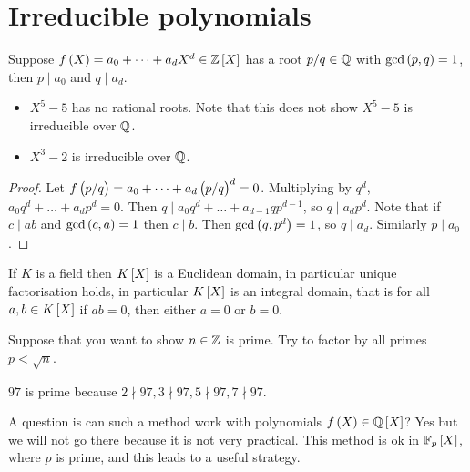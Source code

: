 \pagebreak

\section{Irreducible polynomials}


\begin{proposition}
Suppose $ f\br{X} = a_0 + \dots + a_dX^d \in \ZZ\sbr{X} $ has a root $ p / q \in \mathbb{Q} $ with $ \gcd\br{p, q} = 1 $, then $ p \mid a_0 $ and $ q \mid a_d $.
\end{proposition}

\begin{example*}
\hfill
\begin{itemize}
\item $ X^5 - 5 $ has no rational roots. Note that this does not show $ X^5 - 5 $ is irreducible over $ \mathbb{Q} $.
\item $ X^3 - 2 $ is irreducible over $ \mathbb{Q} $.
\end{itemize}
\end{example*}

\begin{proof}
Let $ f\br{p / q} = a_0 + \dots + a_d\br{p / q}^d = 0 $. Multiplying by $ q^d $, $ a_0q^d + \dots + a_dp^d = 0 $. Then $ q \mid a_0q^d + \dots + a_{d - 1}qp^{d - 1} $, so $ q \mid a_dp^d $. Note that if $ c \mid ab $ and $ \gcd\br{c, a} = 1 $ then $ c \mid b $. Then $ \gcd\br{q, p^d} = 1 $, so $ q \mid a_d $. Similarly $ p \mid a_0 $.
\end{proof}

\begin{remark*}
If $ K $ is a field then $ K\sbr{X} $ is a Euclidean domain, in particular unique factorisation holds, in particular $ K\sbr{X} $ is an integral domain, that is for all $ a, b \in K\sbr{X} $ if $ ab = 0 $, then either $ a = 0 $ or $ b = 0 $.
\end{remark*}

Suppose that you want to show $ n \in \mathbb{Z} $ is prime. Try to factor by all primes $ p < \sqrt{n} $.

\begin{example*}
$ 97 $ is prime because $ 2 \nmid 97, 3 \nmid 97, 5 \nmid 97, 7 \nmid 97 $.
\end{example*}

A question is can such a method work with polynomials $ f\br{X} \in \QQ\sbr{X} $? Yes but we will not go there because it is not very practical. This method is ok in $ \FF_p\sbr{X} $, where $ p $ is prime, and this leads to a useful strategy.

